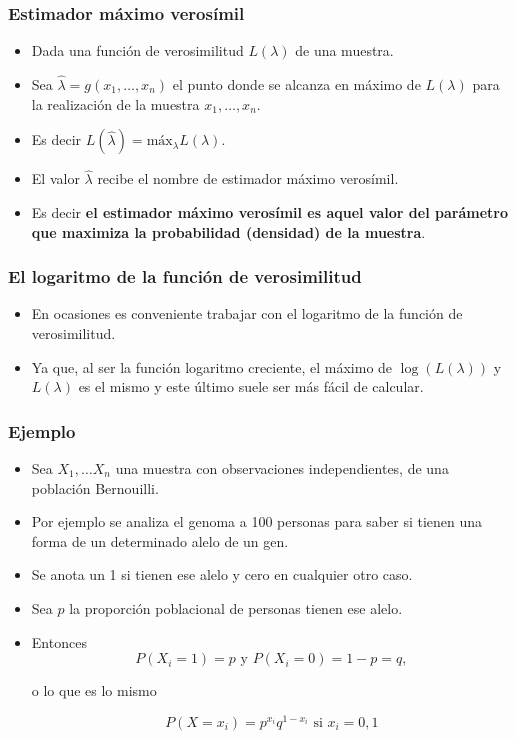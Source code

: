 \begin{frame}
\frametitle{Estimador máximo verosímil}

\begin{itemize} 
\item Dada una función de verosimilitud $L(\lambda)$ de una muestra. 
\item Sea $\hat{\lambda}=g(x_1,\ldots,x_n)$ el punto donde se alcanza en máximo de $L(\lambda)$ para
la realización de la muestra $x_1,\ldots,x_n$.
\item Es decir $L(\hat{\lambda})=\mbox{máx}_{\lambda} L(\lambda)$.
\item El valor $\hat{\lambda}$ recibe el nombre de estimador máximo verosímil.
\item Es decir \textbf{el estimador máximo verosímil es aquel valor del parámetro que maximiza la probabilidad (densidad)
de la muestra}.
\end{itemize}
\end{frame}


\begin{frame}
\frametitle{El logaritmo de la función de verosimilitud}
\begin{itemize}
\item En ocasiones  es conveniente trabajar con el logaritmo de la función de verosimilitud.
\item Ya que, al ser la función logaritmo creciente, el máximo de $\log(L(\lambda))$ y $L(\lambda)$ es el mismo y este último
suele ser más fácil de calcular.
\end{itemize}
\end{frame}

\begin{frame}
\frametitle{Ejemplo}
\begin{itemize}
\item Sea $X_{1},\ldots X_{n}$ una muestra con observaciones
independientes, de una población Bernouilli.
\item  Por ejemplo se analiza el genoma a 100 personas para saber si tienen una forma de un determinado alelo de un gen.
\item  Se anota un 1 si tienen ese alelo  y cero en
cualquier otro caso.
\item  Sea $p$ la proporción poblacional de personas tienen ese alelo.
\item  Entonces
$$P(X_{i}=1)=p\mbox{ y }P(X_{i}=0)=1-p=q,$$

o lo que es lo mismo

 $$P(X=x_{i})=p^{x_{i}} q^{1-x_{i}}\mbox{ si } x_{i}=0,1$$
\end{itemize}
\end{frame}

